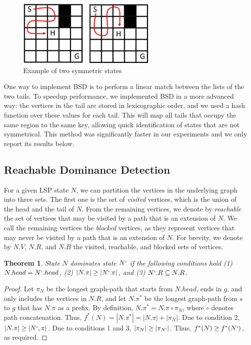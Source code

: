 \documentclass[letterpaper]{article} %
\newcommand\Yossi[1]{\nb{\textbf{Yossi:}}{green}{#1}}
\newcommand\Roni[1]{\nb{\textbf{Roni:}}{blue}{#1}}
\newtheorem{theorem}{Theorem}
\begin{document}
\begin{figure}[ht!]
  \centering
  \includegraphics[width=2.7in]{fig/bsd-example.png}
  \caption{Example of two symmetric states}\label{bsd-example}
\end{figure}

One way to implement BSD is to perform a linear match between the lists of the two tails. To speedup performance, we implemented BSD in a more advanced way: the vertices in the tail are stored in lexicographic order, and we used a hash function over these values for each tail. This will map all tails that occupy the same region to the same key, allowing quick identification of states that are not symmetrical. This method was significantly faster in our experiments and we only report its results below.

\subsection{Reachable Dominance Detection}
For a given LSP state $N$, we can partition the vertices in the underlying graph into three sets. The first one is the set of {\em visited} vertices, which is the union of the head and the tail of $N$.
From the remaining vertices, we denote by \emph{reachable} the set of vertices that may be visited by a path that is an extension of $N$.
We call the remaining vertices the \emph{blocked} vertices, as they represent vertices that may never be visited by a path that is an extension of $N$.
For brevity, we denote by $N.V$, $N.R$, and $N.B$ the visited, reachable, and blocked sets of vertices.

\begin{theorem}
State $N$ dominates state $N`$ if the following conditions hold (1)$N.head=N`.head$,
(2) $|N.\pi| \geq |N`.\pi|$, and (3) $N`.R \subseteq N.R$.
 \label{the:rsd}
\end{theorem}
\begin{proof}

Let $\pi_N$ be the longest graph-path that starts from $N.head$,
ends in $g$, and only includes the vertices in $N.R$,
and let $N.\pi^*$ be the longest graph-path from $s$ to $g$ that has $N.\pi$ as a prefix.
By definition, $N.\pi^*=N.\pi \circ \pi_N$, where $\circ$ denotes path concatenation.
Thus, $f^*(N)=|N.\pi^*|=|N.\pi|+|\pi_N|$.
Due to condition 2, $|N.\pi|\geq |N`,\pi|$.
Due to conditions 1 and 3, $|\pi_N|\geq |\pi_{N`}|$.
Thus, $f^*(N)\geq f^*(N`)$, as required.
\end{proof}
\end{document}
